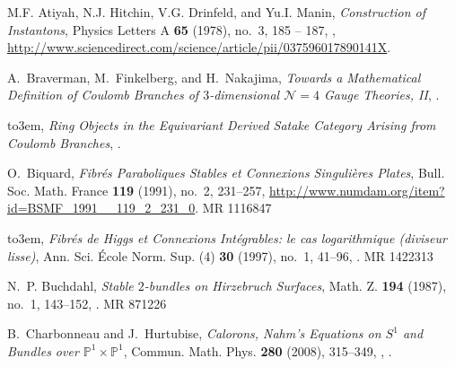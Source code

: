 \documentclass[12pt]{article}
\theoremstyle{definition}
\theoremstyle{remark}
\numberwithin{theorem}{section}
\begin{document}
\providecommand{\bysame}{\leavevmode\hbox to3em{\hrulefill}\thinspace}
\providecommand{\MR}{\relax\ifhmode\unskip\space\fi MR }
\providecommand{\MRhref}[2]{%
  \href{http://www.ams.org/mathscinet-getitem?mr=#1}{#2}
}
\providecommand{\href}[2]{#2}
\begin{thebibliography}{AHDM78}

M.F. Atiyah, N.J. Hitchin, V.G. Drinfeld, and Yu.I. Manin, \emph{{Construction
  of Instantons}}, Physics Letters A \textbf{65} (1978), no.~3, 185 -- 187,
  \href {http://dx.doi.org/http://dx.doi.org/10.1016/0375-9601(78)90141-X}
  {},
  \url{http://www.sciencedirect.com/science/article/pii/037596017890141X}.

A.~Braverman, M.~Finkelberg, and H.~Nakajima, \emph{{Towards a Mathematical
  Definition of Coulomb Branches of $3$-dimensional $\mathcal N=4$ Gauge
  Theories, II}}, \href {http://arxiv.org/abs/1601.03586}
  {}.

\bysame, \emph{{Ring Objects in the Equivariant Derived Satake Category Arising
  from Coulomb Branches}}, \href {http://arxiv.org/abs/1706.02112}
  {}.

O.~Biquard, \emph{{Fibr\'es Paraboliques Stables et Connexions Singuli\`eres
  Plates}}, Bull. Soc. Math. France \textbf{119} (1991), no.~2, 231--257,
  \url{http://www.numdam.org/item?id=BSMF_1991__119_2_231_0}. \MR{1116847}

\bysame, \emph{{Fibr\'es de {H}iggs et Connexions Int\'egrables: le cas
  logarithmique (diviseur lisse)}}, Ann. Sci. \'Ecole Norm. Sup. (4)
  \textbf{30} (1997), no.~1, 41--96, \href
  {http://dx.doi.org/10.1016/S0012-9593(97)89915-6}
  {}. \MR{1422313}

N.~P. Buchdahl, \emph{{Stable {$2$}-bundles on {H}irzebruch Surfaces}}, Math.
  Z. \textbf{194} (1987), no.~1, 143--152, \href
  {http://dx.doi.org/10.1007/BF01168013} {}.
  \MR{871226}

B.~Charbonneau and J.~Hurtubise, \emph{{Calorons, Nahm's Equations on $S^1$ and
  Bundles over $\mathbb {P}^1 \times \mathbb {P}^1$}}, Commun. Math. Phys.
  \textbf{280} (2008), 315--349, \href {http://arxiv.org/abs/math/0610804}
  {}, \href
  {http://dx.doi.org/10.1007/s00220-008-0468-7}
  {}.


\end{thebibliography}
\end{document}
